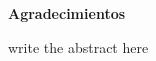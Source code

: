 \thispagestyle{plain}
\begin{center}
    \Huge
    \textbf{Agradecimientos}
\end{center}

write the abstract here

\newpage